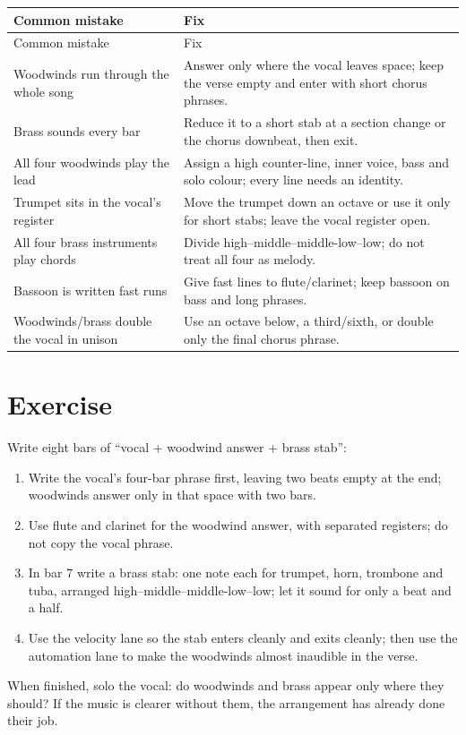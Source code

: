 \begin{longtable}{p{}p{}}
\toprule
Common mistake & Fix \\
\midrule
\endfirsthead
\toprule
Common mistake & Fix \\
\midrule
\endhead
Woodwinds run through the whole song & Answer only where the vocal leaves space; keep the verse empty and enter with short chorus phrases. \\
Brass sounds every bar & Reduce it to a short stab at a section change or the chorus downbeat, then exit. \\
All four woodwinds play the lead & Assign a high counter-line, inner voice, bass and solo colour; every line needs an identity. \\
Trumpet sits in the vocal's register & Move the trumpet down an octave or use it only for short stabs; leave the vocal register open. \\
All four brass instruments play chords & Divide high--middle--middle-low--low; do not treat all four as melody. \\
Bassoon is written fast runs & Give fast lines to flute/clarinet; keep bassoon on bass and long phrases. \\
Woodwinds/brass double the vocal in unison & Use an octave below, a third/sixth, or double only the final chorus phrase. \\
\bottomrule
\end{longtable}

\section{Exercise}
\label{sec:winds-exercise}

\begin{exercise}
Write eight bars of ``vocal + woodwind answer + brass stab'':
\begin{enumerate}
\item Write the vocal's four-bar phrase first, leaving two beats empty at the end; woodwinds answer only in that space with two bars.
\item Use flute and clarinet for the woodwind answer, with separated registers; do not copy the vocal phrase.
\item In bar 7 write a brass stab: one note each for trumpet, horn, trombone and tuba, arranged high--middle--middle-low--low; let it sound for only a beat and a half.
\item Use the velocity lane so the stab enters cleanly and exits cleanly; then use the automation lane to make the woodwinds almost inaudible in the verse.
\end{enumerate}
When finished, solo the vocal: do woodwinds and brass appear only where they should? If the music is clearer without them, the arrangement has already done their job.
\end{exercise}

